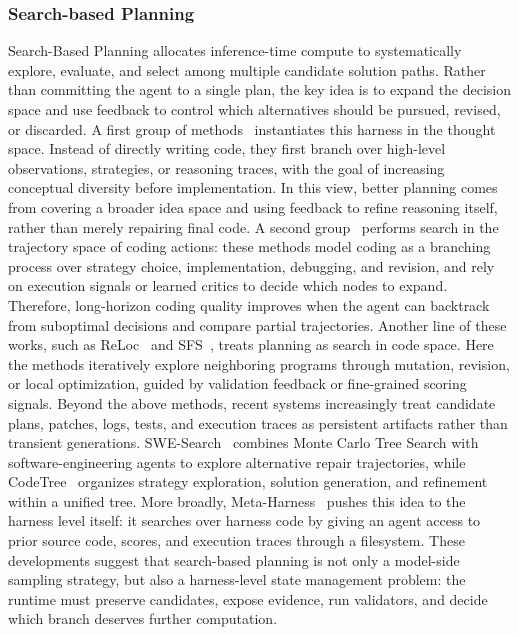 \documentclass{llmxive}
\begin{document}
\subsubsection{Search-based Planning}
Search-Based Planning allocates inference-time compute to systematically explore, evaluate, and select among multiple candidate solution paths. Rather than committing the agent to a single plan, the key idea is to expand the decision space and use feedback to control which alternatives should be pursued, revised, or discarded. A first group of methods~\cite{wang2024planning,li2025rethinkmcts} instantiates this harness in the thought space. Instead of directly writing code, they first branch over high-level observations, strategies, or reasoning traces, with the goal of increasing conceptual diversity before implementation. In this view, better planning comes from covering a broader idea space and using feedback to refine reasoning itself, rather than merely repairing final code. A second group~\cite{li2025codetree,ni2024treeofcode,dainese2024codegenerating,aggarwal2025dars} performs search in the trajectory space of coding actions: these methods model coding as a branching process over strategy choice, implementation, debugging, and revision, and rely on execution signals or learned critics to decide which nodes to expand. Therefore, long-horizon coding quality improves when the agent can backtrack from suboptimal decisions and compare partial trajectories. Another line of these works, such as ReLoc~\cite{lyu2025reloc} and SFS~\cite{light2025sfs}, treats planning as search in code space. Here the methods iteratively explore neighboring programs through mutation, revision, or local optimization, guided by validation feedback or fine-grained scoring signals.
Beyond the above methods, recent systems increasingly treat candidate plans, patches, logs, tests, and execution traces as persistent artifacts rather than transient generations. SWE-Search~\cite{sweSearch2024} combines Monte Carlo Tree Search with software-engineering agents to explore alternative repair trajectories, while CodeTree~\cite{li2025codetree} organizes strategy exploration, solution generation, and refinement within a unified tree. More broadly, Meta-Harness~\cite{lee2026metaharness} pushes this idea to the harness level itself: it searches over harness code by giving an agent access to prior source code, scores, and execution traces through a filesystem. These developments suggest that search-based planning is not only a model-side sampling strategy, but also a harness-level state management problem: the runtime must preserve candidates, expose evidence, run validators, and decide which branch deserves further computation.
\end{document}
